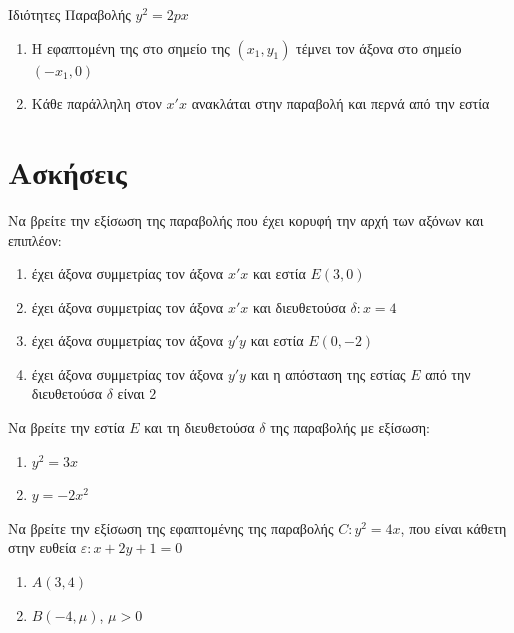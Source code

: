 \documentclass{../../presentation}
\begin{document}
\begin{frame}[label=Ιδιότητες]{Ιδιότητες Παραβολής $y^2=2px$}
  \begin{enumerate}
    \item<1-> Η εφαπτομένη της στο σημείο της $(x_1,y_1)$ τέμνει τον άξονα στο σημείο $(-x_1,0)$
    \item<2-> Κάθε παράλληλη στον $x'x$ ανακλάται στην παραβολή και περνά από την εστία
  \end{enumerate}

\end{frame}

\section{Ασκήσεις}
\begin{askisi}
  Να βρείτε την εξίσωση της παραβολής που έχει κορυφή την αρχή των αξόνων και επιπλέον:
  \begin{enumerate}
    \item<1-> έχει άξονα συμμετρίας τον άξονα $x'x$ και εστία $Ε(3,0)$
    \item<2-> έχει άξονα συμμετρίας τον άξονα $x'x$ και διευθετούσα $δ:x=4$
    \item<3-> έχει άξονα συμμετρίας τον άξονα $y'y$ και εστία $Ε(0,-2)$
    \item<4-> έχει άξονα συμμετρίας τον άξονα $y'y$ και η απόσταση της εστίας $Ε$ από την διευθετούσα $δ$ είναι $2$
  \end{enumerate}


\end{askisi}

\begin{askisi}
  Να βρείτε την εστία $Ε$ και τη διευθετούσα $δ$ της παραβολής με εξίσωση:
  \begin{enumerate}
    \item<1-> $y^2=3x$
    \item<2-> $y=-2x^2$
  \end{enumerate}


\end{askisi}

\begin{askisi}
  Να βρείτε την εξίσωση της εφαπτομένης της παραβολής $C:y^2=4x$, που είναι κάθετη στην ευθεία $ε:x+2y+1=0$
  \begin{enumerate}
    \item<1-> $Α(3,4)$
    \item<2-> $Β(-4,μ)$, $μ>0$
  \end{enumerate}


\end{askisi}
\end{document}
